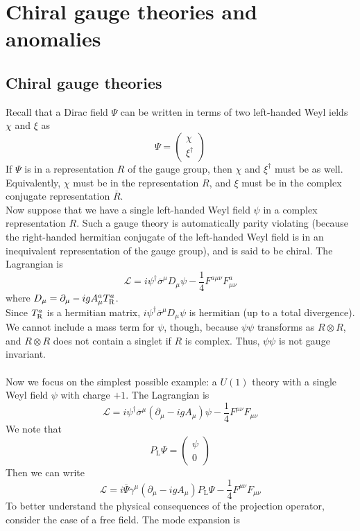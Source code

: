 \section{Chiral gauge theories and anomalies}
\subsection{Chiral gauge theories}
Recall that a Dirac field $\Psi$ can be written in terms of two left-handed Weyl ields $\chi$ and $\xi$ as
\[\Psi = \begin{pmatrix}\chi\\ \xi^{\dagger} \end{pmatrix}\] If $\Psi$ is in a representation $R$ of the gauge group, then $\chi$ and $\xi^{\dagger}$ must be as well. Equivalently, $\chi$ must be in the representation $R$, and $\xi$ must be in the complex conjugate representation $\overline{R}$.
\\
Now suppose that we have a single left-handed Weyl field $\psi$ in a complex representation $R$. Such a gauge theory is automatically parity violating (because the right-handed hermitian conjugate of the left-handed Weyl field is in an inequivalent representation of the gauge group), and is said to be chiral.
The Lagrangian is
\[\mathcal{L} = i\psi^{\dagger} \overline{\sigma}^{\mu} D_{\mu} \psi - \frac{1}{4}F^{a\mu\nu}F^a_{\mu\nu}\]
where $D_{\mu} = \partial_{\mu} - igA^{a}_{\mu} T^a_{\rm R}$.
\\
Since $T^a_{\rm R}$ is a hermitian matrix, $i\psi^{\dagger} \overline{\sigma}^{\mu} D_{\mu} \psi$ is hermitian (up to a total divergence). We cannot include a mass term for $\psi$, though, because $\psi\psi$ transforms as $R \otimes R$, and $R \otimes R$ does not contain a singlet if $R$ is complex. Thus, $\psi\psi$ is not gauge invariant. 
\\ \\
Now we focus on the simplest possible example: a $U(1)$ theory with a single Weyl field $\psi$ with charge $+1$. The Lagrangian is
\[\mathcal{L} = i\psi^{\dagger} \overline{\sigma}^{\mu} (\partial_{\mu} - igA_{\mu}) \psi - \frac{1}{4}F^{\mu\nu}F_{\mu\nu}\]
We note that
\[P_{\mathrm{L}} \Psi = \begin{pmatrix}
\psi \\ 0
\end{pmatrix}\]
Then we can write
\[\mathcal{L} = i\overline{\Psi} \gamma^{\mu} (\partial_{\mu} - igA_{\mu}) P_{\mathrm{L}}\Psi - \frac{1}{4}F^{\mu\nu}F_{\mu\nu}\]
To better understand the physical consequences of the projection operator, consider the case of a free field. The mode expansion is

